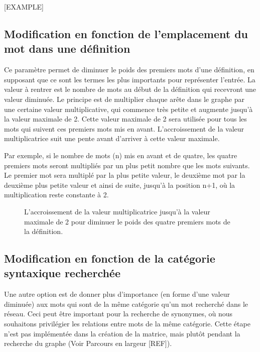 [EXAMPLE]

\subsection{Modification en fonction de l'emplacement du mot dans une définition}
Ce paramètre permet de diminuer le poids des premiers mots d'une définition, en supposant que ce sont les termes les plus importants pour représenter l'entrée. La valeur à rentrer est le nombre de mots au début de la définition qui recevront une valeur diminuée. Le principe est de multiplier chaque arête dans le graphe par une certaine valeur multiplicative, qui commence très petite et augmente jusqu'à la valeur maximale de 2. Cette valeur maximale de 2 sera utilisée pour tous les mots qui suivent ces premiers mots mis en avant. L'accroissement de la valeur multiplicatrice suit une pente avant d'arriver à cette valeur maximale.

Par exemple, si le nombre de mots (n) mis en avant et de quatre, les quatre premiers mots seront multipliés par un plus petit nombre que les mots suivants. Le premier mot sera multiplé par la plus petite valeur, le deuxième mot par la deuxième plus petite valeur et ainsi de suite, jusqu'à la position n+1, où la multiplication reste constante à 2.


\begin{figure}
\centering
\parbox{5cm}{
\def\svgscale{1}

\caption{L'accroissement de la valeur multiplicatrice jusqu'à la valeur maximale de 2 pour diminuer le poids des quatre premiers mots de la définition.}
\label{fig:multiply}}
\end{figure}

\subsection{Modification en fonction de la catégorie syntaxique recherchée}
Une autre option est de donner plus d'importance (en forme d'une valeur diminuée) aux mots qui sont de la même catégorie qu'un mot recherché dans le réseau. Ceci peut être important pour la recherche de synonymes, où nous souhaitons privilégier les relations entre mots de la même catégorie. Cette étape n'est pas implémentée dans la création de la matrice, mais plutôt pendant la recherche du graphe (Voir Parcours en largeur [REF]).







